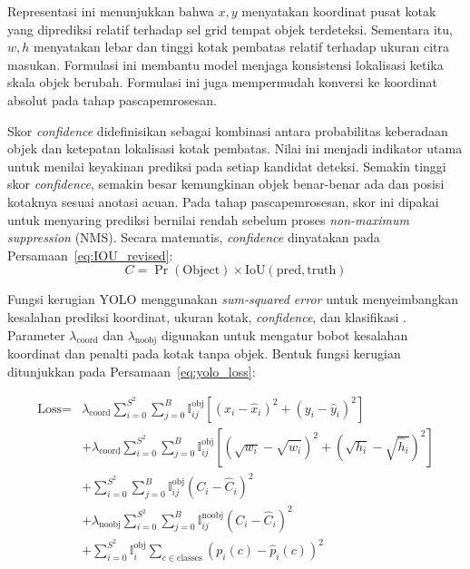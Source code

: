 Representasi ini menunjukkan bahwa \(x, y\) menyatakan koordinat pusat kotak
yang diprediksi relatif terhadap sel grid tempat objek terdeteksi. Sementara
itu, \(w, h\) menyatakan lebar dan tinggi kotak pembatas relatif terhadap
ukuran citra masukan. Formulasi ini membantu model menjaga konsistensi
lokalisasi ketika skala objek berubah. Formulasi ini juga mempermudah
konversi ke koordinat absolut pada tahap pascapemrosesan.

Skor \textit{confidence} didefinisikan sebagai kombinasi antara probabilitas
keberadaan objek dan ketepatan lokalisasi kotak pembatas. Nilai ini menjadi
indikator utama untuk menilai keyakinan prediksi pada setiap kandidat deteksi.
Semakin tinggi skor \textit{confidence}, semakin besar kemungkinan objek
benar-benar ada dan posisi kotaknya sesuai anotasi acuan. Pada tahap
pascapemrosesan, skor ini dipakai untuk menyaring prediksi bernilai rendah
sebelum proses \textit{non-maximum suppression} (NMS). Secara matematis,
\textit{confidence} dinyatakan pada Persamaan~\ref{eq:IOU_revised}:
\begin{equation}
C = \Pr(\text{Object}) \times \text{IoU}(\text{pred}, \text{truth})
\label{eq:IOU_revised}
\end{equation}

Fungsi kerugian YOLO menggunakan \textit{sum-squared error} untuk
menyeimbangkan kesalahan prediksi koordinat, ukuran kotak,
\textit{confidence}, dan klasifikasi \cite{redmon2016you}. Parameter
$\lambda_{\text{coord}}$ dan $\lambda_{\text{noobj}}$ digunakan untuk
mengatur bobot kesalahan koordinat dan penalti pada kotak tanpa objek. Bentuk
fungsi kerugian ditunjukkan pada Persamaan~\ref{eq:yolo_loss}:

\begin{equation}
\label{eq:yolo_loss}
\begin{split} \text{Loss} = & \lambda_{\text{coord}} \sum_{i=0}^{S^2} \sum_{j=0}^{B} \mathbb{I}_{ij}^{\text{obj}} \left[ (x_i - \hat{x}_i)^2 + (y_i - \hat{y}_i)^2 \right] \\ & + \lambda_{\text{coord}} \sum_{i=0}^{S^2} \sum_{j=0}^{B} \mathbb{I}_{ij}^{\text{obj}} \left[ (\sqrt{w_i} - \sqrt{\hat{w}_i})^2 + (\sqrt{h_i} - \sqrt{\hat{h}_i})^2 \right] \\ & + \sum_{i=0}^{S^2} \sum_{j=0}^{B} \mathbb{I}_{ij}^{\text{obj}} (C_i - \hat{C}_i)^2 \\ & + \lambda_{\text{noobj}} \sum_{i=0}^{S^2} \sum_{j=0}^{B} \mathbb{I}_{ij}^{\text{noobj}} (C_i - \hat{C}_i)^2 \\ & + \sum_{i=0}^{S^2} \mathbb{I}_{i}^{\text{obj}} \sum_{c \in \text{classes}} (p_i(c) - \hat{p}_i(c))^2
\end{split}
\end{equation}

